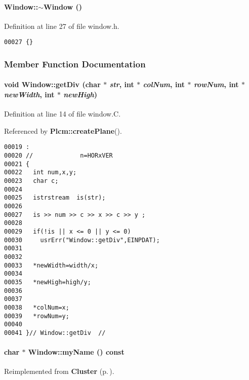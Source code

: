 \paragraph{\setlength{\rightskip}{0pt plus 5cm}Window::$\sim$Window ()\hspace{0.3cm}{\tt  [inline]}}\hfill



Definition at line 27 of file window.h.\small\begin{verbatim}00027 {}
\end{verbatim}\normalsize 


\subsubsection{Member Function Documentation}
\label{Window_a4}
\paragraph{\setlength{\rightskip}{0pt plus 5cm}void Window::get\-Div (char $\ast$ {\em str}, int $\ast$ {\em col\-Num}, int $\ast$ {\em row\-Num}, int $\ast$ {\em new\-Width}, int $\ast$ {\em new\-High})}\hfill



Definition at line 14 of file window.C.

Referenced by {\bf Plcm::create\-Plane}().\small\begin{verbatim}00019 :
00020 //             n=HORxVER
00021 {
00022   int num,x,y;
00023   char c;
00024 
00025   istrstream  is(str);
00026 
00027   is >> num >> c >> x >> c >> y ;
00028 
00029   if(!is || x <= 0 || y <= 0)
00030     usrErr("Window::getDiv",EINPDAT);
00031 
00032 
00033   *newWidth=width/x;
00034 
00035   *newHigh=high/y;
00036 
00037 
00038   *colNum=x;
00039   *rowNum=y;
00040 
00041 }// Window::getDiv  //

\end{verbatim}\normalsize 
\label{Window_a3}
\paragraph{\setlength{\rightskip}{0pt plus 5cm}char $\ast$ Window::my\-Name () const\hspace{0.3cm}{\tt  [inline, virtual]}}\hfill



Reimplemented from {\bf Cluster} {\rm (p.\,\pageref{Cluster_a4})}.

